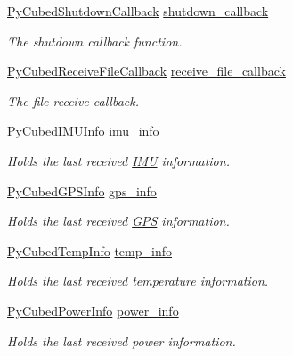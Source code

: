 \begin{DoxyCompactItemize}
\item 
\hyperlink{namespacecubesat_abcc8eedef699fb7e3f433200cc25e181}{Py\+Cubed\+Shutdown\+Callback} \hyperlink{classcubesat_1_1PyCubed_abcdb5ea9c3b544a261a3aa2ec395836f}{shutdown\+\_\+callback}
\begin{DoxyCompactList}\small\item\em The shutdown callback function. \end{DoxyCompactList}\item 
\hyperlink{namespacecubesat_a378b098737c521b2e13df70ad8ddc0ba}{Py\+Cubed\+Receive\+File\+Callback} \hyperlink{classcubesat_1_1PyCubed_a7becf9e9df5a296a53f7f4228c28451a}{receive\+\_\+file\+\_\+callback}
\begin{DoxyCompactList}\small\item\em The file receive callback. \end{DoxyCompactList}\item 
\hyperlink{structcubesat_1_1PyCubedIMUInfo}{Py\+Cubed\+I\+M\+U\+Info} \hyperlink{classcubesat_1_1PyCubed_a8ecd72592ea8f3287a520e2ac834878c}{imu\+\_\+info}
\begin{DoxyCompactList}\small\item\em Holds the last received \hyperlink{classcubesat_1_1IMU}{I\+MU} information. \end{DoxyCompactList}\item 
\hyperlink{structcubesat_1_1PyCubedGPSInfo}{Py\+Cubed\+G\+P\+S\+Info} \hyperlink{classcubesat_1_1PyCubed_a0129f71b136ecc13fc378356431ccad0}{gps\+\_\+info}
\begin{DoxyCompactList}\small\item\em Holds the last received \hyperlink{classcubesat_1_1GPS}{G\+PS} information. \end{DoxyCompactList}\item 
\hyperlink{structcubesat_1_1PyCubedTempInfo}{Py\+Cubed\+Temp\+Info} \hyperlink{classcubesat_1_1PyCubed_a5508151b5f50200754c0a10efcc0445c}{temp\+\_\+info}
\begin{DoxyCompactList}\small\item\em Holds the last received temperature information. \end{DoxyCompactList}\item 
\hyperlink{structcubesat_1_1PyCubedPowerInfo}{Py\+Cubed\+Power\+Info} \hyperlink{classcubesat_1_1PyCubed_ac1feae4409faf165aafdc38489918db3}{power\+\_\+info}
\begin{DoxyCompactList}\small\item\em Holds the last received power information. \end{DoxyCompactList}\item 

\end{DoxyCompactItemize}
